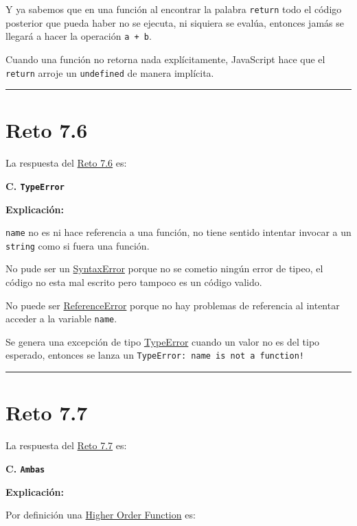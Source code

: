 \documentclass[
  letterpaper,
  DIV=11,
  numbers=noendperiod]{scrreprt}
\begin{document}
Y ya sabemos que en una función al encontrar la palabra \texttt{return}
todo el código posterior que pueda haber no se ejecuta, ni siquiera se
evalúa, entonces jamás se llegará a hacer la operación \texttt{a\ +\ b}.

Cuando una función no retorna nada explícitamente, JavaScript hace que
el \texttt{return} arroje un \texttt{undefined} de manera implícita.

\begin{center}\rule{0.5\linewidth}{0.5pt}\end{center}

\section{Reto 7.6}\label{sec-sol-cap7-reto6}

La respuesta del \hyperref[sec-cap7-reto6]{Reto 7.6} es:

\textbf{C. \texttt{TypeError}}

\textbf{Explicación:}

\texttt{name} no es ni hace referencia a una función, no tiene sentido
intentar invocar a un \texttt{string} como si fuera una función.

No pude ser un \hyperref[glos-syntaxerror]{SyntaxError} porque no se
cometio ningún error de tipeo, el código no esta mal escrito pero
tampoco es un código valido.

No puede ser \hyperref[glos-referenceerror]{ReferenceError} porque no
hay problemas de referencia al intentar acceder a la variable
\texttt{name}.

Se genera una excepción de tipo \hyperref[glos-typeerror]{TypeError}
cuando un valor no es del tipo esperado, entonces se lanza un
\texttt{TypeError:\ name\ is\ not\ a\ function!}

\begin{center}\rule{0.5\linewidth}{0.5pt}\end{center}

\section{Reto 7.7}\label{sec-sol-cap7-reto7}

La respuesta del \hyperref[sec-cap7-reto7]{Reto 7.7} es:

\textbf{C. \texttt{Ambas}}

\textbf{Explicación:}

Por definición una \hyperref[glos-higher_order_function]{Higher Order
Function} es:
\end{document}

